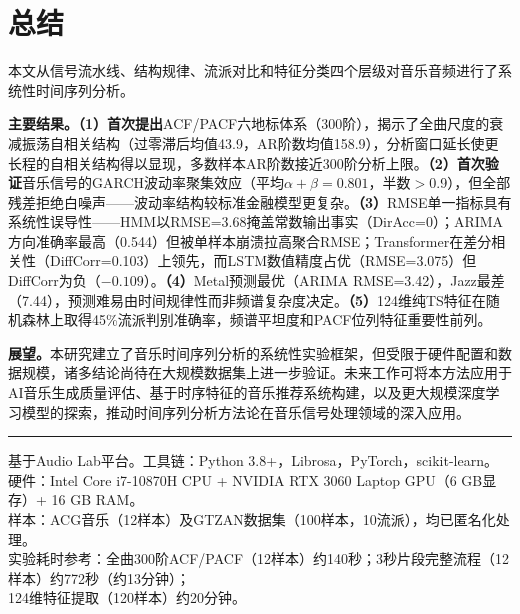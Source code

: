 \documentclass[12pt,a4paper]{article}
\begin{document}
\section{总结}

本文从信号流水线、结构规律、流派对比和特征分类四个层级对音乐音频进行了系统性时间序列分析。

\textbf{主要结果。（1）}\textbf{首次提出}ACF/PACF六地标体系（300阶），揭示了全曲尺度的衰减振荡自相关结构（过零滞后均值43.9，AR阶数均值158.9），分析窗口延长使更长程的自相关结构得以显现，多数样本AR阶数接近300阶分析上限。\textbf{（2）}\textbf{首次验证}音乐信号的GARCH波动率聚集效应（平均$\alpha+\beta=0.801$，半数$>$0.9），但全部残差拒绝白噪声——波动率结构较标准金融模型更复杂。\textbf{（3）}RMSE单一指标具有系统性误导性——HMM以RMSE=3.68掩盖常数输出事实（DirAcc=0）；ARIMA方向准确率最高（0.544）但被单样本崩溃拉高聚合RMSE；Transformer在差分相关性（DiffCorr=0.103）上领先，而LSTM数值精度占优（RMSE=3.075）但DiffCorr为负（$-0.109$）。\textbf{（4）}Metal预测最优（ARIMA RMSE=3.42），Jazz最差（7.44），预测难易由时间规律性而非频谱复杂度决定。\textbf{（5）}124维纯TS特征在随机森林上取得45\%流派判别准确率，频谱平坦度和PACF位列特征重要性前列。

\textbf{展望。}本研究建立了音乐时间序列分析的系统性实验框架，但受限于硬件配置和数据规模，诸多结论尚待在大规模数据集上进一步验证。未来工作可将本方法应用于AI音乐生成质量评估、基于时序特征的音乐推荐系统构建，以及更大规模深度学习模型的探索，推动时间序列分析方法论在音乐信号处理领域的深入应用。

\vspace{10pt}

\begin{center}
\rule{0.5\textwidth}{0.4pt}
\vspace{6pt}
{\small 基于Audio Lab平台。工具链：Python 3.8+，Librosa\cite{mcfee2015}，PyTorch，scikit-learn。\\
硬件：Intel Core i7-10870H CPU + NVIDIA RTX 3060 Laptop GPU（6 GB显存）+ 16 GB RAM。\\
样本：ACG音乐（12样本）及GTZAN数据集\cite{tzanetakis2002}（100样本，10流派），均已匿名化处理。\\
实验耗时参考：全曲300阶ACF/PACF（12样本）约140秒；3秒片段完整流程（12样本）约772秒（约13分钟）；\\
124维特征提取（120样本）约20分钟。}
\end{center}
\end{document}
